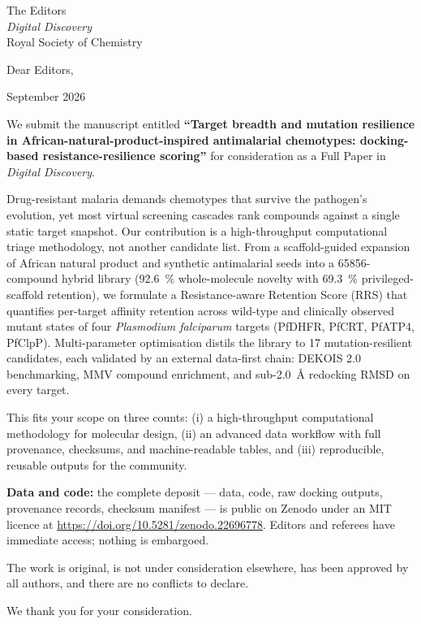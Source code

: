 \documentclass[11pt,a4paper]{letter}
\begin{document}
\begin{letter}{%
  The Editors \\
  \textit{Digital Discovery} \\
  Royal Society of Chemistry
}

\opening{Dear Editors,}

 September 2026

We submit the manuscript entitled \textbf{``Target breadth and mutation resilience in African-natural-product-inspired antimalarial chemotypes: docking-based resistance-resilience scoring''} for consideration as a Full Paper in \textit{Digital Discovery}.

Drug-resistant malaria demands chemotypes that survive the pathogen's evolution, yet most virtual screening cascades rank compounds against a single static target snapshot. Our contribution is a high-throughput computational triage methodology, not another candidate list. From a scaffold-guided expansion of African natural product and synthetic antimalarial seeds into a \num{65856}-compound hybrid library (\qty{92.6}{\percent} whole-molecule novelty with \qty{69.3}{\percent} privileged-scaffold retention), we formulate a Resistance-aware Retention Score (RRS) that quantifies per-target affinity retention across wild-type and clinically observed mutant states of four \textit{Plasmodium falciparum} targets (PfDHFR, PfCRT, PfATP4, PfClpP). Multi-parameter optimisation distils the library to 17 mutation-resilient candidates, each validated by an external data-first chain: DEKOIS 2.0 benchmarking, MMV compound enrichment, and sub-\qty{2.0}{\angstrom} redocking RMSD on every target.

This fits your scope on three counts: (i) a high-throughput computational methodology for molecular design, (ii) an advanced data workflow with full provenance, checksums, and machine-readable tables, and (iii) reproducible, reusable outputs for the community.

\textbf{Data and code:} the complete deposit --- data, code, raw docking outputs, provenance records, checksum manifest --- is public on Zenodo under an MIT licence at \url{https://doi.org/10.5281/zenodo.22696778}. Editors and referees have immediate access; nothing is embargoed.

The work is original, is not under consideration elsewhere, has been approved by all authors, and there are no conflicts to declare.

\closing{We thank you for your consideration.}

\end{letter}
\end{document}

